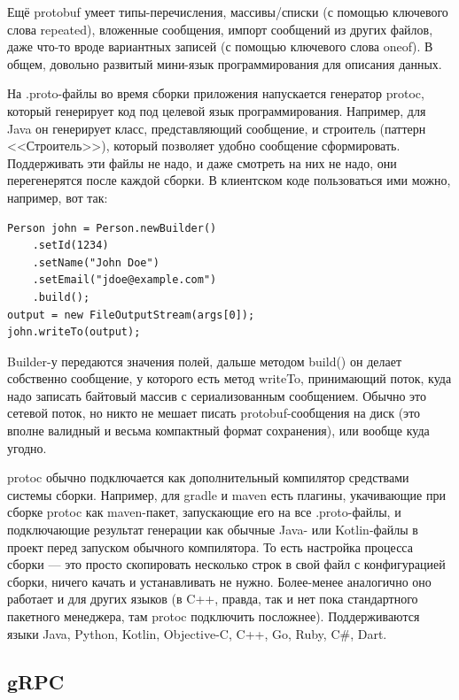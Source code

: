 \documentclass{../../text-style}
\begin{document}
Ещё protobuf умеет типы-перечисления, массивы/списки (с помощью ключевого слова repeated), вложенные сообщения, импорт сообщений из других файлов, даже что-то вроде вариантных записей (с помощью ключевого слова oneof). В общем, довольно развитый мини-язык программирования для описания данных.

На .proto-файлы во время сборки приложения напускается генератор protoc, который генерирует код под целевой язык программирования. Например, для Java он генерирует класс, представляющий сообщение, и строитель (паттерн <<Строитель>>), который позволяет удобно сообщение сформировать. Поддерживать эти файлы не надо, и даже смотреть на них не надо, они перегенерятся после каждой сборки. В клиентском коде пользоваться ими можно, например, вот так:

\begin{verbatim}
Person john = Person.newBuilder()
    .setId(1234)
    .setName("John Doe")
    .setEmail("jdoe@example.com")
    .build();
output = new FileOutputStream(args[0]);
john.writeTo(output);
\end{verbatim}

Builder-у передаются значения полей, дальше методом build() он делает собственно сообщение, у которого есть метод writeTo, принимающий поток, куда надо записать байтовый массив с сериализованным сообщением. Обычно это сетевой поток, но никто не мешает писать protobuf-сообщения на диск (это вполне валидный и весьма компактный формат сохранения), или вообще куда угодно.

protoc обычно подключается как дополнительный компилятор средствами системы сборки. Например, для gradle и maven есть плагины, укачивающие при сборке protoc как maven-пакет, запускающие его на все .proto-файлы, и подключающие результат генерации как обычные Java- или Kotlin-файлы в проект перед запуском обычного компилятора. То есть настройка процесса сборки --- это просто скопировать несколько строк в свой файл с конфигурацией сборки, ничего качать и устанавливать не нужно. Более-менее аналогично оно работает и для других языков (в C++, правда, так и нет пока стандартного пакетного менеджера, там protoc подключить посложнее). Поддерживаются языки Java, Python, Kotlin, Objective-C, C++, Go, Ruby, C\#, Dart.

\subsection{gRPC}
\end{document}
